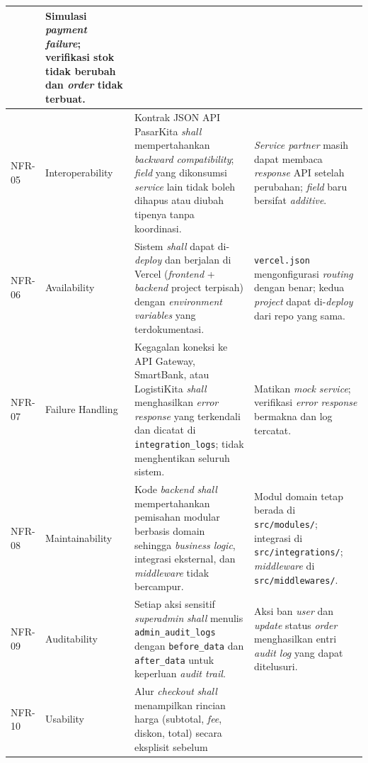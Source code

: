 \begin{longtable}{|L{1cm}|L{2.5cm}|L{6.5cm}|L{4.5cm}|}
        & Simulasi \textit{payment failure}; verifikasi stok tidak berubah dan
          \textit{order} tidak terbuat. \\
    \hline
    NFR-05
        & Interoperability
        & Kontrak JSON API PasarKita \textit{shall} mempertahankan
          \textit{backward compatibility}; \textit{field} yang dikonsumsi
          \textit{service} lain tidak boleh dihapus atau diubah tipenya tanpa
          koordinasi.
        & \textit{Service partner} masih dapat membaca \textit{response} API
          setelah perubahan; \textit{field} baru bersifat \textit{additive}. \\
    \hline
    NFR-06
        & Availability
        & Sistem \textit{shall} dapat di-\textit{deploy} dan berjalan di Vercel
          (\textit{frontend} + \textit{backend} project terpisah) dengan
          \textit{environment variables} yang terdokumentasi.
        & \texttt{vercel.json} mengonfigurasi \textit{routing} dengan benar;
          kedua \textit{project} dapat di-\textit{deploy} dari repo yang sama. \\
    \hline
    NFR-07
        & Failure Handling
        & Kegagalan koneksi ke API Gateway, SmartBank, atau LogistiKita
          \textit{shall} menghasilkan \textit{error response} yang terkendali dan
          dicatat di \texttt{integration\_logs}; tidak menghentikan seluruh sistem.
        & Matikan \textit{mock service}; verifikasi \textit{error response}
          bermakna dan log tercatat. \\
    \hline
    NFR-08
        & Maintainability
        & Kode \textit{backend} \textit{shall} mempertahankan pemisahan modular
          berbasis domain sehingga \textit{business logic}, integrasi eksternal,
          dan \textit{middleware} tidak bercampur.
        & Modul domain tetap berada di \texttt{src/modules/}; integrasi di
          \texttt{src/integrations/}; \textit{middleware} di
          \texttt{src/middlewares/}. \\
    \hline
    NFR-09
        & Auditability
        & Setiap aksi sensitif \textit{superadmin} \textit{shall} menulis
          \texttt{admin\_audit\_logs} dengan \texttt{before\_data} dan
          \texttt{after\_data} untuk keperluan \textit{audit trail}.
        & Aksi ban \textit{user} dan \textit{update} status \textit{order}
          menghasilkan entri \textit{audit log} yang dapat ditelusuri. \\
    \hline
    NFR-10
        & Usability
        & Alur \textit{checkout} \textit{shall} menampilkan rincian harga
          (subtotal, \textit{fee}, diskon, total) secara eksplisit sebelum

\end{longtable}
